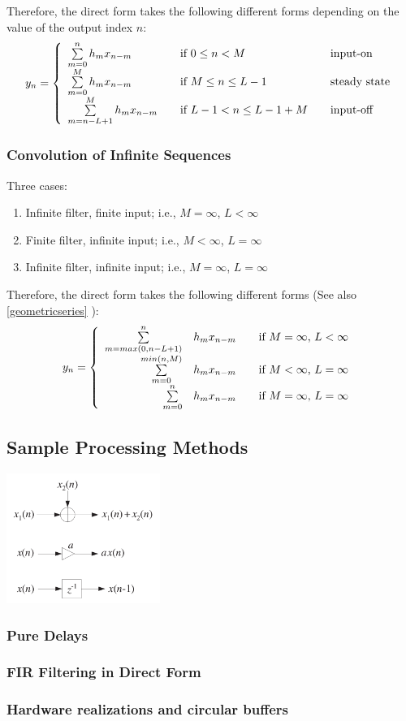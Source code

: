 Therefore, the direct form takes the following different forms depending
on the value of the output index $n$:
\[
	y_n =
		\left\{
			\begin{array}{l l l}
				\sum\limits_{m=0}^{n} h_m x_{n-m}		& \quad \text{if } 0 \leq n < M			& \quad \text{input-on} \\
				\sum\limits_{m=0}^{M} h_m x_{n-m}		& \quad \text{if } M \leq n \leq L-1	& \quad \text{steady state} \\
				\sum\limits_{m=n-L+1}^{M} h_m x_{n-m}	& \quad \text{if } L-1 < n \leq L-1+M	& \quad \text{input-off}
			\end{array}
		\right.
\]


\subsubsection{Convolution of Infinite Sequences}
Three cases:
\begin{enumerate}
  \item Infinite filter, finite input; i.e., $M = \infty$, $L < \infty$
  \item Finite filter, infinite input; i.e., $M < \infty$, $L = \infty$
  \item Infinite filter, infinite input; i.e., $M = \infty$, $L = \infty$
\end{enumerate}
\resetArrayStretch

Therefore, the direct form takes the following different forms (See also \ref{geometricseries} ):
\[
	y_n =
		\left\{
			\begin{array}{r l l}
				\sum\limits_{m=max(0,n-L+1)}^{n} & h_m x_{n-m}		& \quad \text{if $M = \infty$, $L < \infty$} \\	
				\sum\limits_{m=0}^{min(n,M)} & h_m x_{n-m}		& \quad \text{if $M < \infty$, $L = \infty$ } \\
				\sum\limits_{m=0}^{n} & h_m x_{n-m}	& \quad \text{if $M = \infty$, $L = \infty$ }
			\end{array}
		\right.
\]


\subsection{Sample Processing Methods}
  \includegraphics[width=5cm]{./picture/basic_blocks}
\subsubsection{Pure Delays}
\subsubsection{FIR Filtering in Direct Form}
\subsubsection{Hardware realizations and circular buffers }